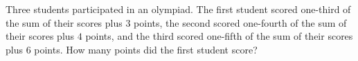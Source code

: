 Three students participated in an olympiad. The first student scored one-third of the sum of their scores plus $3$ points, the second scored one-fourth of the sum of their scores plus $4$ points, and the third scored one-fifth of the sum of their scores plus $6$ points. How many points did the first student score?
